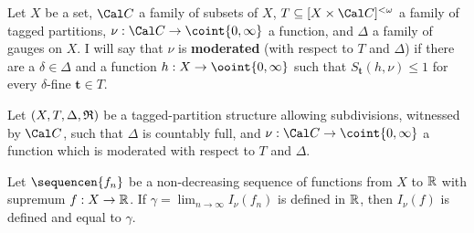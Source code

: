 Let $X$ be a set, $\Cal C$ a family of subsets of $X$,
$T\subseteq[X\times\Cal C]^{<\omega}$ a family of tagged partitions,
$\nu:\Cal C\to\coint{0,\infty}$ a function, and $\Delta$ a family of
gauges on $X$.   I will say that $\nu$ is {\bf moderated} (with respect
to $T$ and $\Delta$) if there are a $\delta\in\Delta$ and a function
$h:X\to\ooint{0,\infty}$ such that $S_{\pmb{t}}(h,\nu)\le 1$ for every
$\delta$-fine $\pmb{t}\in T$.

 Let $(X,T,\Delta,\frak R)$
be a
tagged-partition structure allowing subdivisions, witnessed by $\Cal C$,
such that $\Delta$ is countably full, and
$\nu:\Cal C\to\coint{0,\infty}$ a function
which is moderated with respect to $T$ and $\Delta$.

Let $\sequencen{f_n}$ be a non-decreasing sequence of functions from
$X$ to $\Bbb R$ with supremum $f:X\to\Bbb R$.   If
$\gamma=\lim_{n\to\infty}I_{\nu}(f_n)$ is defined in
$\Bbb R$, then $I_{\nu}(f)$ is defined and equal to $\gamma$.

